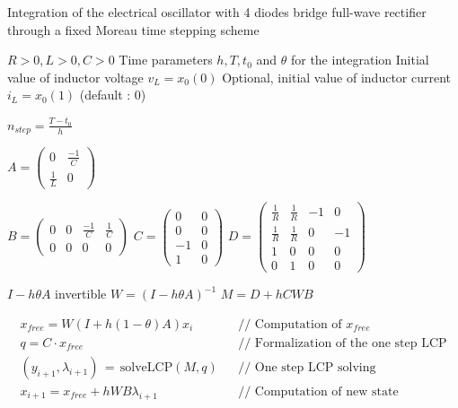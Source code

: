 \documentclass[10pt]{article}
\begin{document}
\begin{algorithm}
\caption{Integration of the electrical oscillator with 4 diodes bridge full-wave rectifier 
through a fixed Moreau time stepping scheme}
\begin{algorithmic} 

\REQUIRE $R > 0 , L > 0 , C > 0$
\REQUIRE Time parameters $h,T,t_0$ and $\theta$ for the integration 
\REQUIRE Initial value of inductor voltage $v_L = x_0(0)$
\REQUIRE Optional, initial value  of inductor current $i_L = x_0(1)$ (default : 0)

\STATE $n_{step} = \frac{T - t_0}{h}$

\STATE $A = \left( \begin{array}{cc}
0 & \frac{-1}{C}\\
\frac{1}{L} & 0
\end{array} \right)$

\STATE $B = \left( \begin{array}{cccc}
0 & 0 & \frac{-1}{C} & \frac{1}{C}\\
0 & 0 & 0 & 0
\end{array} \right)$
\STATE $C = \left( \begin{array}{cc}
0 & 0\\
0 & 0\\
-1 & 0\\
1 & 0
\end{array} \right)$
\STATE $D = \left( \begin{array}{cccc}
\frac{1}{R} & \frac{1}{R} & -1 & 0\\
\frac{1}{R} & \frac{1}{R} & 0 & -1\\
1 & 0 & 0 & 0\\
0 & 1 & 0 & 0
\end{array} \right)$

\REQUIRE $I - h \theta A$ invertible
\STATE $W = (I - h \theta A)^{-1}$
\STATE $M = D + h C W B$

\STATE \begin{eqnarray*} 
x_{free} = W (I + h (1 - \theta) A) x_i && \textrm{// Computation of $x_{free}$} \\
q = C \cdot x_{free} &&  \textrm{// Formalization of the one step LCP} \\
(y_{i+1},\lambda_{i+1})\,=\,\textrm{solveLCP}(M,q) &&  \textrm{// One step LCP solving} \\
x_{i+1} = x_{free} + h W B \lambda_{i+1} &&  \textrm{// Computation of new state}
\end{eqnarray*}
\ENDFOR

\end{algorithmic}
\end{algorithm}
\end{document}
